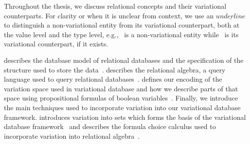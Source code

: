 %
Throughout the thesis, we discuss relational concepts and their
variational counterparts. 
For clarity or when it is unclear from context, we use
an $\underline{underline}$ to distinguish a non-variational entity
from its variational counterpart, 
both at the value level and the type level,
e.g., \pElem\ is a 
non-variational entity while \elem\ is its variational counterpart,
if it exists.


%
 describes the database model of relational databases and 
the specification of
the structure used to store the data~\cite{AliceBook}. 
 describes the relational algebra, a query language used to query relational databases~\cite{AliceBook}.
%
 defines our encoding of the variation space used in 
variational database and how we describe parts of that space using propositional formulas of boolean variables~\cite{ATW18poly,ATW17dbpl}.
%
Finally, we introduce the main techniques used to incorporate variation into our variational 
database framework.
 introduces variation into sets which forms the basis of the variational database
framework~\cite{EWC13fosd,Walk14onward,ATW17dbpl} 
and  describes the formula choice calculus used to incorporate 
variation into relational algebra~\cite{HW16fosd}.



%




